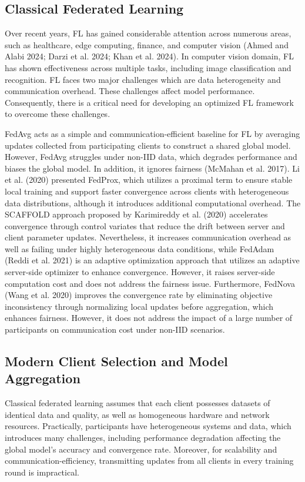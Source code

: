 \documentclass[pdflatex,sn-mathphys-num,oneside]{sn-jnl}%
\theoremstyle{thmstyleone}%
\theoremstyle{thmstyletwo}%
\theoremstyle{thmstylethree}%
\begin{document}
\subsection{Classical Federated Learning}

Over recent years, FL has gained considerable attention across numerous areas, such as healthcare, edge computing, finance, and computer vision (Ahmed and Alabi 2024; Darzi et al. 2024; Khan et al. 2024). In computer vision domain, FL has shown effectiveness across multiple tasks, including image classification and recognition. FL faces two major challenges which are data heterogeneity and communication overhead. These challenges affect model performance. Consequently, there is a critical need for developing an optimized FL framework to overcome these challenges.

FedAvg acts as a simple and communication-efficient baseline for FL by averaging updates collected from participating clients to construct a shared global model. However, FedAvg struggles under non-IID data, which degrades performance and biases the global model. In addition, it ignores fairness (McMahan et al. 2017). Li et al. (2020) presented FedProx, which utilizes a proximal term to ensure stable local training and support faster convergence across clients with heterogeneous data distributions, although it introduces additional computational overhead. The SCAFFOLD approach proposed by Karimireddy et al. (2020) accelerates convergence through control variates that reduce the drift between server and client parameter updates. Nevertheless, it increases communication overhead as well as failing under highly heterogeneous data conditions, while FedAdam (Reddi et al. 2021) is an adaptive optimization approach that utilizes an adaptive server-side optimizer to enhance convergence. However, it raises server-side computation cost and does not address the fairness issue. Furthermore, FedNova (Wang et al. 2020) improves the convergence rate by eliminating objective inconsistency through normalizing local updates before aggregation, which enhances fairness. However, it does not address the impact of a large number of participants on communication cost under non-IID scenarios. 

\subsection{Modern Client Selection and Model Aggregation}

Classical federated learning assumes that each client possesses datasets of identical data and quality, as well as homogeneous hardware and network resources. Practically, participants have heterogeneous systems and data, which introduces many challenges, including performance degradation affecting the global model's accuracy and convergence rate. Moreover, for scalability and communication-efficiency, transmitting updates from all clients in every training round is impractical.
\end{document}
